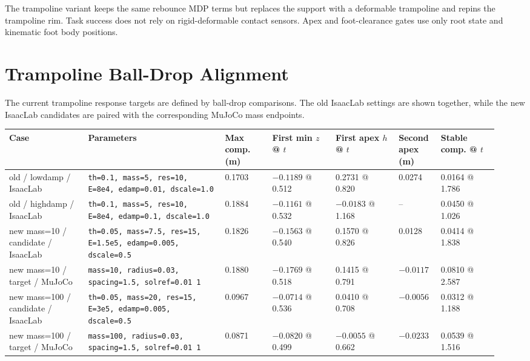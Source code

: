 \documentclass[11pt, a4paper]{article}
\begin{document}
The trampoline variant keeps the same rebounce MDP terms but replaces the
support with a deformable trampoline and repins the trampoline rim. Task success
does not rely on rigid-deformable contact sensors. Apex and foot-clearance gates
use only root state and kinematic foot body positions.

\section{Trampoline Ball-Drop Alignment}

The current trampoline response targets are defined by ball-drop comparisons.
The old IsaacLab settings are shown together, while the new IsaacLab candidates
are paired with the corresponding MuJoCo mass endpoints.

\begin{center}
\scriptsize
\begin{tabular}{p{0.15\linewidth}p{0.26\linewidth}p{0.095\linewidth}p{0.12\linewidth}p{0.12\linewidth}p{0.08\linewidth}p{0.11\linewidth}}
\hline
Case & Parameters & Max comp. (m) & First min $z$ @ $t$ & First apex $h$ @ $t$ & Second apex (m) & Stable comp. @ $t$ \\
\hline
old / lowdamp / IsaacLab &
\texttt{th=0.1, mass=5, res=10, E=8e4, edamp=0.01, dscale=1.0} &
0.1703 & $-0.1189$ @ 0.512 & 0.2731 @ 0.820 & 0.0274 & 0.0164 @ 1.786 \\
old / highdamp / IsaacLab &
\texttt{th=0.1, mass=5, res=10, E=8e4, edamp=0.1, dscale=1.0} &
0.1884 & $-0.1161$ @ 0.532 & $-0.0183$ @ 1.168 & -- & 0.0450 @ 1.026 \\
\hline
new mass=10 / candidate / IsaacLab &
\texttt{th=0.05, mass=7.5, res=15, E=1.5e5, edamp=0.005, dscale=0.5} &
0.1826 & $-0.1563$ @ 0.540 & 0.1570 @ 0.826 & 0.0128 & 0.0414 @ 1.838 \\
new mass=10 / target / MuJoCo &
\texttt{mass=10, radius=0.03, spacing=1.5, solref=0.01 1} &
0.1880 & $-0.1769$ @ 0.518 & 0.1415 @ 0.791 & $-0.0117$ & 0.0810 @ 2.587 \\
\hline
new mass=100 / candidate / IsaacLab &
\texttt{th=0.05, mass=20, res=15, E=3e5, edamp=0.005, dscale=0.5} &
0.0967 & $-0.0714$ @ 0.536 & 0.0410 @ 0.708 & $-0.0056$ & 0.0312 @ 1.188 \\
new mass=100 / target / MuJoCo &
\texttt{mass=100, radius=0.03, spacing=1.5, solref=0.01 1} &
0.0871 & $-0.0820$ @ 0.499 & $-0.0055$ @ 0.662 & $-0.0233$ & 0.0539 @ 1.516 \\
\hline
\end{tabular}
\end{center}
\end{document}
